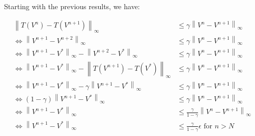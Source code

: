 Starting with the previous results, we have:

\begin{align*}
    \left\| T(V^n) - T(V^{n+1}) \right\|_{\infty} &\leq \gamma \left\| V^{n} - V^{n+1} \right\|_{\infty} \\
    \Leftrightarrow
    \left\| V^{n+1} - V^{n+2} \right\|_{\infty} &\leq \gamma \left\| V^{n} - V^{n+1} \right\|_{\infty} \\
    \Leftrightarrow
    \left\| V^{n+1} - V^* \right\|_{\infty} - \left\| V^{n+2} - V^* \right\|_{\infty} &\leq \gamma \left\| V^{n} - V^{n+1} \right\|_{\infty} \\
    \Leftrightarrow
    \left\| V^{n+1} - V^* \right\|_{\infty} - \left\| T(V^{n+1}) - T(V^*) \right\|_{\infty} &\leq \gamma \left\| V^{n} - V^{n+1} \right\|_{\infty} \\
    \Leftrightarrow
    \left\| V^{n+1} - V^* \right\|_{\infty} - \gamma \left\| V^{n+1} - V^* \right\|_{\infty} &\leq \gamma \left\| V^{n} - V^{n+1} \right\|_{\infty} \\
    \Leftrightarrow
    (1 - \gamma) \left\| V^{n+1} - V^* \right\|_{\infty} &\leq \gamma \left\| V^{n} - V^{n+1} \right\|_{\infty} \\
    \Leftrightarrow
    \left\| V^{n+1} - V^* \right\|_{\infty} &\leq \frac{\gamma}{1 - \gamma} \left\| V^{n} - V^{n+1} \right\|_{\infty} \\
    \Leftrightarrow
    \left\| V^{n+1} - V^* \right\|_{\infty} &\leq \frac{\gamma}{1 - \gamma} \epsilon \text{ for } n > N
\end{align*}

